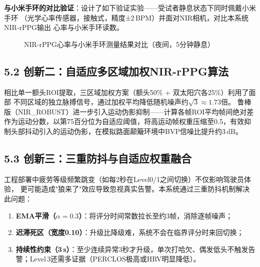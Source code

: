 \documentclass[a4paper,12pt]{article}
\begin{document}
\textbf{与小米手环的对比验证}：设计了如下验证实验——受试者静息状态下同时佩戴小米手环
（光学心率传感器，接触式，精度±2\,BPM）并面对NIR相机，对比本系统NIR-rPPG输出
心率与小米手环读数。

\begin{figure}[H]
\centering
{}
\caption{NIR-rPPG心率与小米手环测量结果对比（夜间，5分钟静息）}
\label{fig:miband_compare}
\end{figure}

\subsection*{5.2 创新二：自适应多区域加权NIR-rPPG算法}

相比单一额头ROI提取，三区域加权方案（额头50\% + 双太阳穴各25\%）利用了面部
不同区域的独立脉搏信号，通过加权平均降低随机噪声约$\sqrt{3}\approx1.73$倍。
鲁棒版（NIR\_ROBUST）进一步引入运动伪影抑制——计算各帧ROI平均帧间绝对差作为运动分数，以第75百分位为自适应阈值，将高运动帧权重压缩至0.5，有效抑制头部抖动引入的运动伪影，在模拟路面颠簸环境中BVP信噪比提升约3\,dB。

\subsection*{5.3 创新三：三重防抖与自适应权重融合}

工程部署中疲劳等级频繁跳变（如每2秒在Level0/1之间切换）不仅影响驾驶员体验，
更可能造成"狼来了"效应导致忽视真实告警。本系统通过三重防抖机制解决此问题：

\begin{enumerate}[leftmargin=2em, itemsep=3pt]
  \item \textbf{EMA平滑（$\alpha=0.3$）}：将评分时间常数拉长至约3帧，消除逐帧噪声；
  \item \textbf{迟滞死区（宽度0.10）}：升级比降级难，系统不会在临界评分时来回切换；
  \item \textbf{持续性约束（3\,s）}：至少连续异常3秒才升级，单次打哈欠、偶发低头不触发告警；Level\,3还需多证据（PERCLOS极高或HRV明显降低）。
\end{enumerate}
\end{document}
